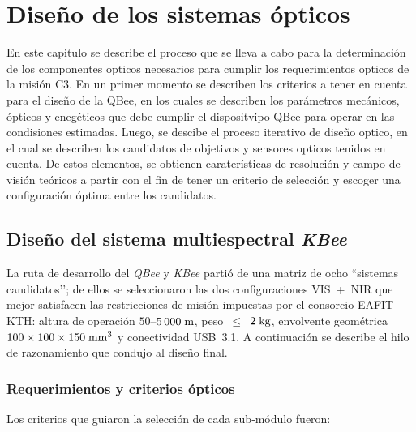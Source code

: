 \chapter{Diseño de los sistemas ópticos}         %

En este capitulo se describe el proceso que se lleva a cabo para la determinación de los componentes opticos necesarios para cumplir los requerimientos opticos de la misión C3. En un primer momento se describen los criterios a tener en cuenta para el diseño de la QBee, en los cuales se describen los parámetros mecánicos, ópticos y enegéticos que debe cumplir el dispositvipo QBee para operar en las condisiones estimadas. Luego, se descibe el proceso iterativo de diseño optico, en el cual se describen los candidatos de objetivos y sensores opticos tenidos en cuenta. De estos elementos, se obtienen caraterísticas de resolución y campo de visión teóricos a partir con el fin de tener un criterio de selección y escoger una configuración óptima entre los candidatos.
\section{Diseño del sistema multiespectral \textit{KBee}}

La ruta de desarrollo del \textit{QBee} y \textit{KBee} partió de una matriz de ocho “sistemas   candidatos’’; de ellos se seleccionaron las dos configuraciones VIS + NIR que mejor satisfacen las restricciones de misión impuestas por el consorcio
EAFIT–KTH: altura de operación $50$–$5\,000\;{\rm m}$, peso $\leq$ $2\;{\rm kg}$,
envolvente geométrica $100\times100\times150\;{\rm mm}^{3}$ y conectividad USB 3.1.
A continuación se describe el hilo de razonamiento que condujo al diseño final.

\subsection{Requerimientos y criterios ópticos}

Los criterios que guiaron la selección de cada sub‑módulo fueron:


